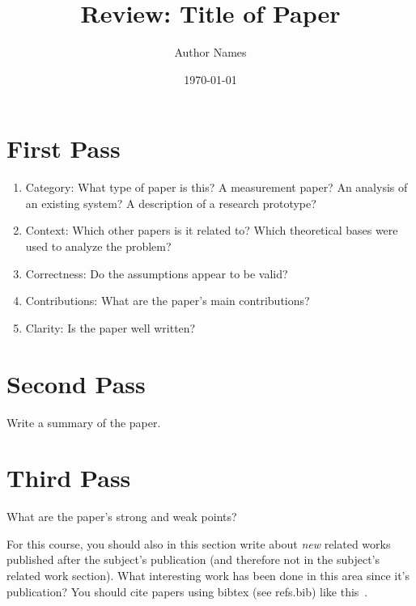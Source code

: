 \documentclass{article}
\title{Review: Title of Paper}
\author[1]{Author Names}
\affil[1]{Loyola Marymount University}
\date{\today}
\begin{document}
\maketitle


\section{First Pass}
\begin{enumerate}
    \item Category: What type of paper is this? A measurement paper? An analysis of an existing system? A description of a research prototype?
    \item Context: Which other papers is it related to? Which theoretical bases were used to analyze the problem?
    \item Correctness: Do the assumptions appear to be valid?
    \item Contributions: What are the paper’s main contributions?
    \item Clarity: Is the paper well written?
\end{enumerate}

\section{Second Pass}
Write a summary of the paper.

\section{Third Pass}
What are the paper's strong and weak points?

For this course, you should also in this section write about \textit{new} related works published after the subject's publication (and therefore not in the subject's related work section). What interesting work has been done in this area since it's publication? You should cite papers using bibtex (see refs.bib) like this~\cite{how_to_read_a_paper}.


\printbibliography
\end{document}
